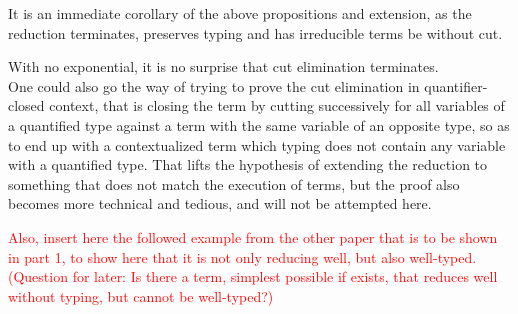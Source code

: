 \begin{myproof}
It is an immediate corollary of the above propositions and extension, as the reduction terminates, preserves typing and has irreducible terms be without cut.
\end{myproof}

\remark With no exponential, it is no surprise that cut elimination terminates.\\

\remark One could also go the way of trying to prove the cut elimination in quantifier-closed context, that is closing the term by cutting successively for all variables of a quantified type against a term with the same variable of an opposite type, so as to end up with a contextualized term which typing does not contain any variable with a quantified type. That lifts the hypothesis of extending the reduction to something that does not match the execution of terms, but the proof also becomes more technical and tedious, and will not be attempted here.

\textcolor{red}{Also, insert here the followed example from the other paper that is to be shown in part 1, to show here that it is not only reducing well, but also well-typed. (Question for later: Is there a term, simplest possible if exists, that reduces well without typing, but cannot be well-typed?)} %